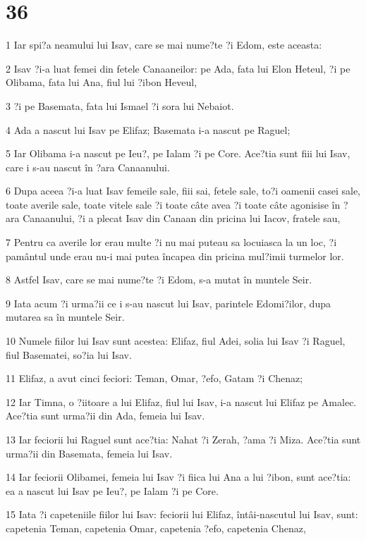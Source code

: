\chapter{36}

\par 1 Iar spi?a neamului lui Isav, care se mai nume?te ?i Edom, este aceasta:
\par 2 Isav ?i-a luat femei din fetele Canaaneilor: pe Ada, fata lui Elon Heteul, ?i pe Olibama, fata lui Ana, fiul lui ?ibon Heveul,
\par 3 ?i pe Basemata, fata lui Ismael ?i sora lui Nebaiot.
\par 4 Ada a nascut lui Isav pe Elifaz; Basemata i-a nascut pe Raguel;
\par 5 Iar Olibama i-a nascut pe Ieu?, pe Ialam ?i pe Core. Ace?tia sunt fiii lui Isav, care i s-au nascut în ?ara Canaanului.
\par 6 Dupa aceea ?i-a luat Isav femeile sale, fiii sai, fetele sale, to?i oamenii casei sale, toate averile sale, toate vitele sale ?i toate câte avea ?i toate câte agonisise în ?ara Canaanului, ?i a plecat Isav din Canaan din pricina lui Iacov, fratele sau,
\par 7 Pentru ca averile lor erau multe ?i nu mai puteau sa locuiasca la un loc, ?i pamântul unde erau nu-i mai putea încapea din pricina mul?imii turmelor lor.
\par 8 Astfel Isav, care se mai nume?te ?i Edom, s-a mutat în muntele Seir.
\par 9 Iata acum ?i urma?ii ce i s-au nascut lui Isav, parintele Edomi?ilor, dupa mutarea sa în muntele Seir.
\par 10 Numele fiilor lui Isav sunt acestea: Elifaz, fiul Adei, solia lui Isav ?i Raguel, fiul Basematei, so?ia lui Isav.
\par 11 Elifaz, a avut cinci feciori: Teman, Omar, ?efo, Gatam ?i Chenaz;
\par 12 Iar Timna, o ?iitoare a lui Elifaz, fiul lui Isav, i-a nascut lui Elifaz pe Amalec. Ace?tia sunt urma?ii din Ada, femeia lui Isav.
\par 13 Iar feciorii lui Raguel sunt ace?tia: Nahat ?i Zerah, ?ama ?i Miza. Ace?tia sunt urma?ii din Basemata, femeia lui Isav.
\par 14 Iar feciorii Olibamei, femeia lui Isav ?i fiica lui Ana a lui ?ibon, sunt ace?tia: ea a nascut lui Isav pe Ieu?, pe Ialam ?i pe Core.
\par 15 Iata ?i capeteniile fiilor lui Isav: feciorii lui Elifaz, întâi-nascutul lui Isav, sunt: capetenia Teman, capetenia Omar, capetenia ?efo, capetenia Chenaz,
